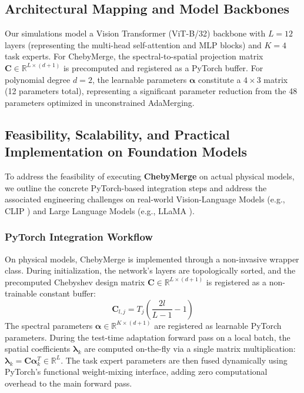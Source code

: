 \documentclass{article}
\theoremstyle{plain}
\theoremstyle{definition}
\theoremstyle{remark}
\begin{document}
\subsection{Architectural Mapping and Model Backbones}
Our simulations model a Vision Transformer (ViT-B/32) backbone with $L=12$ layers (representing the multi-head self-attention and MLP blocks) and $K=4$ task experts. 
For ChebyMerge, the spectral-to-spatial projection matrix $\mathbf{C} \in \mathbb{R}^{L \times (d+1)}$ is precomputed and registered as a PyTorch buffer. For polynomial degree $d=2$, the learnable parameters $\boldsymbol{\alpha}$ constitute a $4 \times 3$ matrix (12 parameters total), representing a significant parameter reduction from the 48 parameters optimized in unconstrained AdaMerging.

\subsection{Feasibility, Scalability, and Practical Implementation on Foundation Models}
To address the feasibility of executing \textbf{ChebyMerge} on actual physical models, we outline the concrete PyTorch-based integration steps and address the associated engineering challenges on real-world Vision-Language Models (e.g., CLIP \cite{radford2021learning}) and Large Language Models (e.g., LLaMA \cite{touvron2023llama}).

\subsubsection{PyTorch Integration Workflow}
On physical models, ChebyMerge is implemented through a non-invasive wrapper class. During initialization, the network's layers are topologically sorted, and the precomputed Chebyshev design matrix $\mathbf{C} \in \mathbb{R}^{L \times (d+1)}$ is registered as a non-trainable constant buffer:
\begin{equation}
\mathbf{C}_{l, j} = T_j\left(\frac{2l}{L-1} - 1\right)
\end{equation}
The spectral parameters $\boldsymbol{\alpha} \in \mathbb{R}^{K \times (d+1)}$ are registered as learnable PyTorch parameters. During the test-time adaptation forward pass on a local batch, the spatial coefficients $\boldsymbol{\lambda}_k$ are computed on-the-fly via a single matrix multiplication: $\boldsymbol{\lambda}_k = \mathbf{C}\boldsymbol{\alpha}_k^T \in \mathbb{R}^L$. The task expert parameters are then fused dynamically using PyTorch's functional weight-mixing interface, adding zero computational overhead to the main forward pass.
\end{document}
